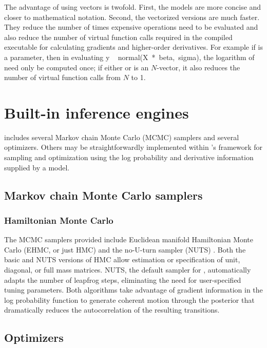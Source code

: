 \documentclass[article]{jss}
\begin{document}
The advantage of using vectors is twofold.  First, the models are more
concise and closer to mathematical notation.  Second, the vectorized
versions are much faster.  They reduce the number of times expensive
operations need to be evaluated and also reduce the number of virtual
function calls required in the compiled  executable for
calculating gradients and higher-order derivatives.  For example if
 is a parameter, then in evaluating {y ~
  normal(X~*~beta,~sigma)}, the logarithm of  need only be
computed once; if either  or  is an $N$-vector, it
also reduces the number of virtual function calls from $N$ to 1.

\section{Built-in inference engines}\label{inference-engines.section}

 includes several Markov chain Monte Carlo (MCMC)
samplers and several optimizers.  Others may be straightforwardly
implemented within 's  framework for
sampling and optimization using the log probability and derivative
information supplied by a model.

\subsection{Markov chain Monte Carlo samplers}

\subsubsection{Hamiltonian Monte Carlo}

The MCMC samplers provided include Euclidean manifold Hamiltonian
Monte Carlo (EHMC, or just HMC) \citep{DuaneEtAl:1987, Neal:1994,
  Neal:2011} and the no-U-turn sampler (NUTS)
\citep{HoffmanGelman:2011}.  Both the basic and NUTS versions of HMC
allow estimation or specification of unit, diagonal, or full mass
matrices.  NUTS, the default sampler for ,
automatically adapts the number of leapfrog steps, eliminating the
need for user-specified tuning parameters.  Both algorithms take
advantage of gradient information in the log probability function to
generate coherent motion through the posterior that dramatically
reduces the autocorrelation of the resulting transitions.

\subsection{Optimizers}
\end{document}
